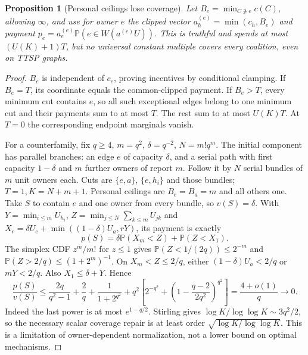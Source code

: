 \documentclass[11pt]{article}
\newtheorem{proposition}[theorem]{Proposition}
\theoremstyle{definition}\newtheorem{definition}[theorem]{Definition}
\theoremstyle{remark}\newtheorem{remark}[theorem]{Remark}
\newcommand{\Prob}{\mathbb P}
\begin{document}
\begin{proposition}[Personal ceilings lose coverage]\label{noise:ceilings}
Let $B_e=\min_{C\not\ni e}c(C)$, allowing $\infty$, and use for owner
$e$ the clipped vector $a_h^{(e)}=\min(c_h,B_e)$ and payment
$p_e=a_e^{(e)}\Prob(e\in W(a^{(e)}U))$.
This is truthful and spends at most $(U(K)+1)T$, but no universal constant
multiple covers every coalition, even on TTSP graphs.
\end{proposition}
\begin{proof}
$B_e$ is independent of $c_e$, proving incentives by conditional clamping.
If $B_e=T$, its coordinate equals the common-clipped payment. If $B_e>T$,
every minimum cut contains $e$, so all such exceptional edges belong to one
minimum cut and their payments sum to at most $T$. The rest sum to at most
$U(K)T$. At $T=0$ the corresponding endpoint marginals vanish.

For a counterfamily, fix $q\ge4$, $m=q^2$, $\delta=q^{-2}$,
$N=m!q^m$. The initial component has parallel branches: an edge $e$ of
capacity $\delta$, and a serial path with first capacity $1-\delta$ and
$m$ further owners of report $m$. Follow it by $N$ serial bundles of $m$
unit owners each. Cuts are $\{e,a\}$, $\{e,h_i\}$ and those bundles;
$T=1,K=N+m+1$. Personal ceilings are $B_e=B_a=m$ and all others one.
Take $S$ to contain $e$ and one owner from every bundle, so $v(S)=\delta$.
With $Y=\min_{i\le m}U_{h_i}$,
$Z=\min_{j\le N}\sum_{k\le m}U_{jk}$ and
$X_r=\delta U_e+\min((1-\delta)U_a,rY)$, its payment is exactly
\[
 p(S)=\delta\Prob(X_m<Z)+\Prob(Z<X_1).
\]
The simplex CDF $z^m/m!$ for $z\le1$ gives
$\Prob(Z<1/(2q))\le2^{-m}$ and
$\Prob(Z>2/q)\le(1+2^m)^{-1}$.
On $X_m<Z\le2/q$, either $(1-\delta)U_a<2/q$ or $mY<2/q$.
Also $X_1\le\delta+Y$. Hence
\[
 \frac{p(S)}{v(S)}\le
 \frac{2q}{q^2-1}+\frac2q+\frac1{1+2^{q^2}}
 +q^2\left[2^{-q^2}+
  \left(1-\frac{q-2}{2q^2}\right)^{q^2}\right]
 =\frac{4+o(1)}q\longrightarrow0.
\]
Indeed the last power is at most $e^{1-q/2}$.
Stirling gives $\log K/\log\log K\sim3q^2/2$, so the necessary scalar
coverage repair is at least order $\sqrt{\log K/\log\log K}$.
This is a limitation of owner-dependent normalization, not a lower bound
on optimal mechanisms.
\end{proof}
\end{document}

